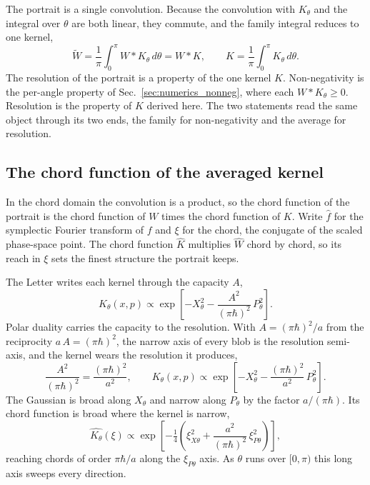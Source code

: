 \documentclass[%
  aps, amsmath, amssymb, onecolumn, 11pt
]{revtex4-2}
\begin{document}
The portrait is a single convolution. Because the convolution with
$K_\theta$ and the integral over $\theta$ are both linear, they commute,
and the family integral reduces to one kernel,
\begin{equation}
\widetilde W = \frac{1}{\pi}\int_0^\pi W * K_\theta \, d\theta = W * K,
\qquad
K = \frac{1}{\pi}\int_0^\pi K_\theta\,d\theta.
\label{eq:single_conv}
\end{equation}
The resolution of the portrait is a property of the one kernel $K$.
Non-negativity is the per-angle property of
Sec.~\ref{sec:numerics_nonneg}, where each $W * K_\theta \ge 0$.
Resolution is the property of $K$ derived here. The two statements
read the same object through its two ends, the family for non-negativity
and the average for resolution.

\subsection{The chord function of the averaged kernel}
\label{sec:chordkernel}

In the chord domain the convolution is a product, so the chord function
of the portrait is the chord function of $W$ times the chord function of
$K$. Write $\widehat f$ for the symplectic Fourier transform of $f$
and $\xi$ for the chord, the conjugate of the scaled phase-space point.
The chord function $\widehat{K}$ multiplies $\widehat W$ chord by
chord, so its reach in $\xi$ sets the finest structure the portrait keeps.

The Letter writes each kernel through the capacity $A$,
\begin{equation}
K_\theta(x,p) \propto
\exp\!\left[-X_\theta^2 - \frac{A^2}{(\pi\hbar)^2}\,P_\theta^2\right].
\label{eq:kernel_A}
\end{equation}
Polar duality carries the capacity to the resolution. With
$A = (\pi\hbar)^2/a$ from the reciprocity $a\,A = (\pi\hbar)^2$,
the narrow axis of every blob is the resolution semi-axis, and the kernel
wears the resolution it produces,
\begin{equation}
\frac{A^2}{(\pi\hbar)^2} = \frac{(\pi\hbar)^2}{a^2},
\qquad
K_\theta(x,p) \propto
\exp\!\left[-X_\theta^2 - \frac{(\pi\hbar)^2}{a^2}\,P_\theta^2\right].
\label{eq:kernel_atilde}
\end{equation}
The Gaussian is broad along $X_\theta$ and narrow along $P_\theta$ by the
factor $a/(\pi\hbar)$. Its chord function is broad where the kernel
is narrow,
\begin{equation}
\widehat{K_\theta}(\xi) \propto
\exp\!\left[-\tfrac14\!\left(\xi_{X\theta}^2
+ \frac{a^2}{(\pi\hbar)^2}\,\xi_{P\theta}^2\right)\right],
\label{eq:kernel_chord_theta}
\end{equation}
reaching chords of order $\pi\hbar/a$ along the $\xi_{P\theta}$ axis.
As $\theta$ runs over $[0,\pi)$ this long axis sweeps every direction.
\end{document}

